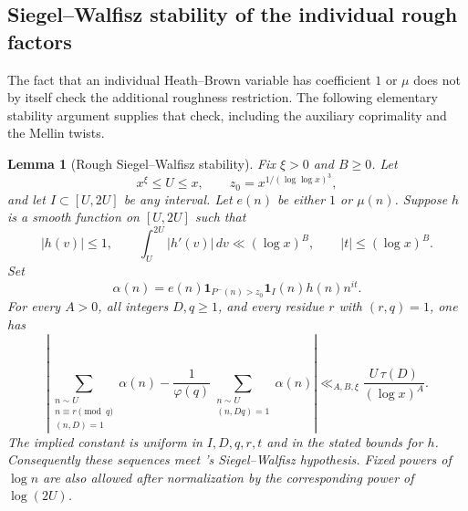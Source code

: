 \documentclass[11pt]{article}
\newtheorem{lemma}[theorem]{Lemma}
\begin{document}


\subsection{Siegel--Walfisz stability of the individual rough factors}
\label{sec:rough-sw-stability}

The fact that an individual Heath--Brown variable has coefficient
$1$ or $\mu$ does not by itself check the additional roughness
restriction. The following elementary stability argument supplies
that check, including the auxiliary coprimality and the Mellin twists.

\begin{lemma}[Rough Siegel--Walfisz stability]
\label{lem:rough-sw}
Fix $\xi>0$ and $B\ge0$. Let
\[
 x^\xi\le U\le x,\qquad z_0=x^{1/(\log\log x)^3},
\]
and let $I\subset[U,2U]$ be any interval.
Let $e(n)$ be either $1$ or $\mu(n)$.
Suppose $h$ is a smooth function on $[U,2U]$ such that
\[
 |h(v)|\le1,\qquad
 \int_U^{2U}|h'(v)|\,dv\ll(\log x)^B,
 \qquad |t|\le(\log x)^B.
\]
Set
\[
 \alpha(n)=e(n)\mathbf1_{P^-(n)>z_0}\mathbf1_I(n)
                  h(n)n^{it}.
\]
For every $A>0$, all integers $D,q\ge1$, and every residue $r$
with $(r,q)=1$, one has
\begin{equation}\label{eq:rough-sw-full}
 \left|
 \sum_{\substack{n\sim U\\n\equiv r\pmod q\\(n,D)=1}}\alpha(n)
 -\frac1{\varphi(q)}
       \sum_{\substack{n\sim U\\(n,Dq)=1}}\alpha(n)
 \right|
 \ll_{A,B,\xi}\frac{U\,\tau(D)}{(\log x)^A}.
\end{equation}
The implied constant is uniform in $I,D,q,r,t$ and in the stated
bounds for $h$. Consequently these sequences meet
\cite[Definition 2.1 and Proposition 5.2]{Lichtman2023}'s
Siegel--Walfisz hypothesis. Fixed powers of $\log n$ are also
allowed after normalization by the corresponding power of
$\log(2U)$.
\end{lemma}
\end{document}
